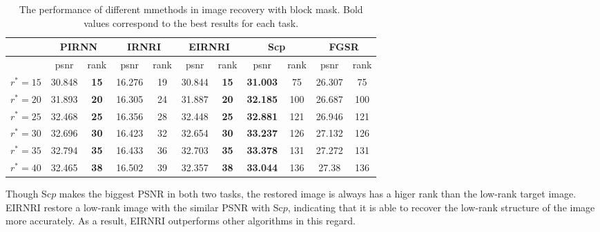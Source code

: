 \documentclass[twoside,11pt]{article}
\numberwithin{equation}{section}
\begin{document}
\begin{table}[tbhp]
  \begin{tabular}{ccccccccccc}
    \toprule
                        & \multicolumn{2}{c}{PIRNN} & \multicolumn{2}{c}{IRNRI} & \multicolumn{2}{c}{EIRNRI} & \multicolumn{2}{c}{Scp} & \multicolumn{2}{c}{FGSR} \\
    \hline
                        & psnr         & rank       & psnr          & rank       & psnr          & rank       & psnr        & rank      & psnr         & rank      \\
    \hline
$r^{*}=15$ & 30.848    & \textbf{15}   & 16.276        & 19         & 30.844    & \textbf{15}    & \textbf{31.003}  & 75   & 26.307       & 75        \\
$r^{*}=20$ & 31.893    & \textbf{20}   & 16.305        & 24         & 31.887    & \textbf{20}    & \textbf{32.185}  & 100  & 26.687       & 100       \\
$r^{*}=25$ & 32.468    & \textbf{25}   & 16.356        & 28         & 32.448    & \textbf{25}    & \textbf{32.881}  & 121  & 26.946       & 121       \\
$r^{*}=30$ & 32.696    & \textbf{30}   & 16.423        & 32         & 32.654    & \textbf{30}    & \textbf{33.237}  & 126  & 27.132       & 126       \\
$r^{*}=35$ & 32.794    & \textbf{35}   & 16.433        & 36         & 32.703    & \textbf{35}    & \textbf{33.378}  & 131  & 27.272       & 131       \\
$r^{*}=40$ & 32.465    & \textbf{38}   & 16.502        & 39         & 32.357    & \textbf{38}    & \textbf{33.044}  & 136  & 27.38        & 136       \\
    \bottomrule
  \end{tabular}
  \captionsetup{singlelinecheck=off, justification=raggedright}
  \caption{The performance of different mmethods in image recovery with block mask. Bold values correspond to the best results for each task.
  }
  \label{tab_img_recovery_block_R1}
  \end{table}


Though Sc$p$ makes the biggest PSNR in both two tasks, the restored image is always has a higer rank than the low-rank target image. EIRNRI restore a low-rank image with the similar PSNR with Sc$p$, indicating that it is able to recover the low-rank structure of the image more accurately. As a result, EIRNRI outperforms other algorithms in this regard.
\end{document}
